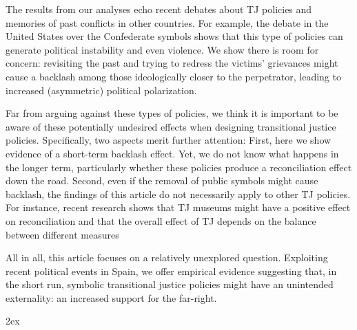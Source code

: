 \documentclass[12pt, notitlepage]{article}
\begin{document}
The results from our analyses echo recent debates about TJ policies and memories of past conflicts in other countries. For example, the debate in the United States over the Confederate symbols shows that this type of policies can generate political instability and even violence. We show there is room for concern: revisiting the past and trying to redress the victims' grievances might cause a backlash among those ideologically closer to the perpetrator, leading to increased (asymmetric) political polarization.

Far from arguing against these types of policies, we think it is important to be aware of these potentially undesired effects when designing transitional justice policies. Specifically, two aspects merit further attention:
First, here we show evidence of a short-term backlash effect. Yet, we do not know what happens in the longer term, particularly whether these policies produce a reconciliation effect down the road. Second, even if the removal of public symbols might cause backlash, the findings of this article do not necessarily apply to other TJ policies. For instance, recent research shows that TJ museums might have a positive effect on reconciliation \citep{Balcells:2020aa} and that the overall effect of TJ depends on the balance between different measures \citep{Olsen:2010aa, Loyle:2017aa}

All in all, this article focuses on a relatively unexplored question. Exploiting recent political events in Spain, we offer empirical evidence suggesting that, in the short run, symbolic transitional justice policies might have an unintended externality: an increased support for the far-right.

\newpage
\begingroup
\parindent 0pt
\parskip 2ex
\def\enotesize{\normalsize}
\theendnotes
\endgroup

\clearpage



\newpage

\end{document}
